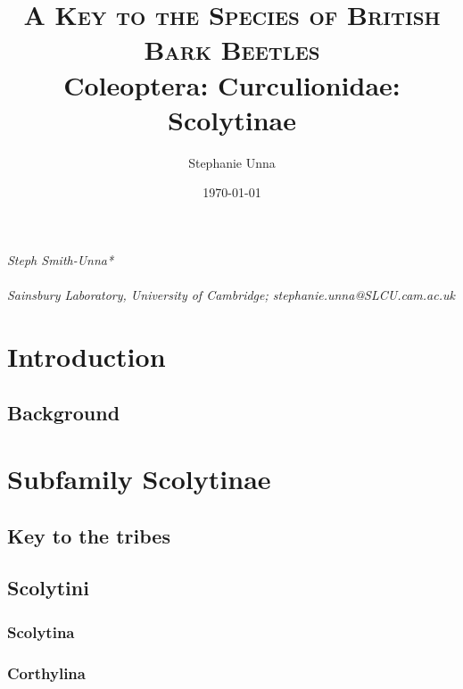 \documentclass[paper=a4, fontsize=11pt]{scrartcl}
\title{
\normalfont \normalsize
\textsc{A Key to the Species of British Bark Beetles} \\ [25pt] %
\huge Coleoptera: Curculionidae: Scolytinae \\ %
}
\author{Stephanie Unna}
\date{\normalsize\today} %
\numberwithin{equation}{section} %
\numberwithin{figure}{section} %
\numberwithin{table}{section} %
\begin{document}
\maketitle %


\newpage

\fancyhead{}
\fancyfoot[L]{} %
\fancyfoot[C]{} %
\fancyfoot[R]{\thepage} %

\tableofcontents

{\it Steph Smith-Unna*} \hfill \\ [1ex]
 \hfill \\ [1ex]

{\it *Sainsbury Laboratory, University of Cambridge; stephanie.unna@SLCU.cam.ac.uk}

\newpage

\section{Introduction}
\label{sec:Introduction}
\doublespacing

\subsection{Background}

\section{Subfamily Scolytinae}
\label{sec:Tribes}
\doublespacing

\subsection{Key to the tribes}
\subsection{Scolytini}
\subsubsection{Scolytina}
\subsubsection{Corthylina}
\end{document}
